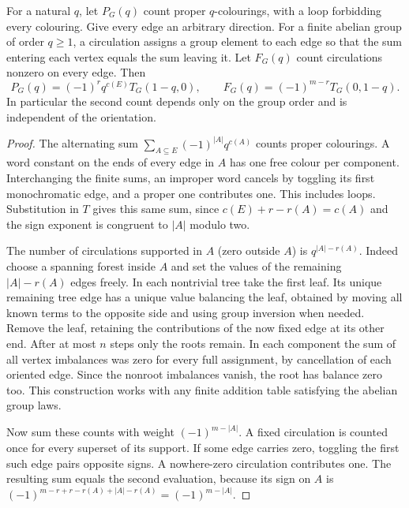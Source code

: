\begin{theorem}\leavevmode\label{fl:tutteflow}
For a natural $q$, let $P_G(q)$ count proper $q$-colourings, with a loop
forbidding every colouring. Give every edge an arbitrary direction.
For a finite abelian group of order $q\ge1$, a circulation assigns a
group element to each edge so that the sum entering each vertex equals
the sum leaving it. Let $F_G(q)$ count circulations nonzero on every
edge. Then
\[
 P_G(q)=(-1)^r q^{c(E)}T_G(1-q,0),\qquad
 F_G(q)=(-1)^{m-r}T_G(0,1-q).
\]
In particular the second count depends only on the group order and
is independent of the orientation.
\end{theorem}
\begin{proof}
The alternating sum $\sum_{A\subseteq E}(-1)^{|A|}q^{c(A)}$
counts proper colourings. A word constant on the ends of every edge
in $A$ has one free colour per component. Interchanging the finite
sums, an improper word cancels by toggling its first monochromatic
edge, and a proper one contributes one. This includes loops.
Substitution in $T$ gives this same sum, since $c(E)+r-r(A)=c(A)$
and the sign exponent is congruent to $|A|$ modulo two.

The number of circulations supported in $A$ (zero outside $A$) is
$q^{|A|-r(A)}$. Indeed choose a spanning forest inside $A$ and set
the values of the remaining $|A|-r(A)$ edges freely. In each
nontrivial tree take the first leaf. Its unique remaining tree edge
has a unique value balancing the leaf, obtained by moving all known
terms to the opposite side and using group inversion when needed.
Remove the leaf, retaining the contributions of the now fixed edge at
its other end. After at most $n$ steps only the roots remain. In each
component the sum of all vertex imbalances was zero for every full
assignment, by cancellation of each oriented edge. Since the nonroot
imbalances vanish, the root has balance zero too. This construction
works with any finite addition table satisfying the abelian group laws.

Now sum these counts with weight $(-1)^{m-|A|}$. A fixed circulation
is counted once for every superset of its support. If some edge
carries zero, toggling the first such edge pairs opposite signs.
A nowhere-zero circulation contributes one. The resulting sum equals
the second evaluation, because its sign on $A$ is
$(-1)^{m-r+r-r(A)+|A|-r(A)}=(-1)^{m-|A|}$.
\end{proof}

